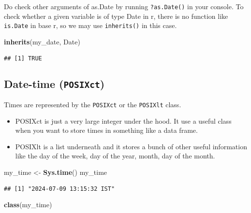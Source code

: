 \documentclass[
]{book}
\newenvironment{Shaded}{\begin{snugshade}}{\end{snugshade}}
\newcommand{\FunctionTok}[1]{\textcolor[rgb]{0.13,0.29,0.53}{\textbf{#1}}}
\newcommand{\NormalTok}[1]{#1}
\newcommand{\OtherTok}[1]{\textcolor[rgb]{0.56,0.35,0.01}{#1}}
\newcommand{\StringTok}[1]{\textcolor[rgb]{0.31,0.60,0.02}{#1}}
\providecommand{\tightlist}{%
  \setlength{\itemsep}{0pt}\setlength{\parskip}{0pt}}
\begin{document}
Do check other arguments of as.Date by running \texttt{?as.Date()} in your console. To check whether a given variable is of type Date in r, there is no function like \texttt{is.Date} in base r, so we may use \texttt{inherits()} in this case.

\begin{Shaded}
\begin{Highlighting}[]
\FunctionTok{inherits}\NormalTok{(my\_date, }\StringTok{\textquotesingle{}Date\textquotesingle{}}\NormalTok{)}
\end{Highlighting}
\end{Shaded}

\begin{verbatim}
## [1] TRUE
\end{verbatim}

\hypertarget{date-time-posixct}{%
\subsection{\texorpdfstring{Date-time (\texttt{POSIXct})}{Date-time (POSIXct)}}\label{date-time-posixct}}

Times are represented by the \texttt{POSIXct} or the \texttt{POSIXlt} class.

\begin{itemize}
\tightlist
\item
  POSIXct is just a very large integer under the hood. It use a useful class when you want to store times in something like a data frame.
\item
  POSIXlt is a list underneath and it stores a bunch of other useful information like the day of the week, day of the year, month, day of the month.
\end{itemize}

\begin{Shaded}
\begin{Highlighting}[]
\NormalTok{my\_time }\OtherTok{\textless{}{-}} \FunctionTok{Sys.time}\NormalTok{()}
\NormalTok{my\_time}
\end{Highlighting}
\end{Shaded}

\begin{verbatim}
## [1] "2024-07-09 13:15:32 IST"
\end{verbatim}

\begin{Shaded}
\begin{Highlighting}[]
\FunctionTok{class}\NormalTok{(my\_time)}
\end{Highlighting}
\end{Shaded}
\end{document}
